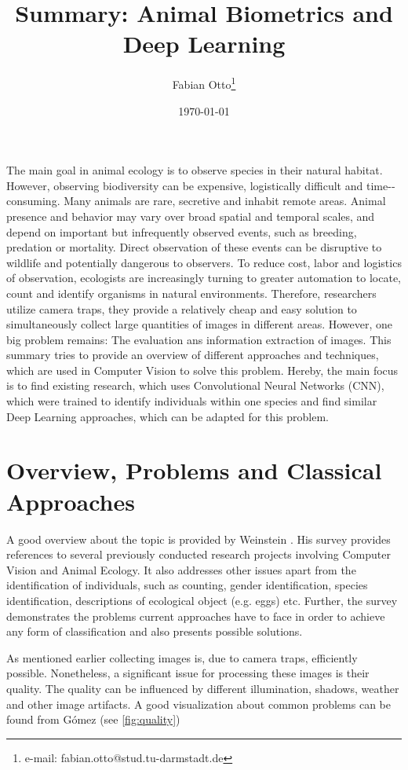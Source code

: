 \documentclass[electronic]{vgtc}             %
\title{Summary: Animal Biometrics and Deep Learning} %
\author{Fabian Otto\thanks{e-mail: fabian.otto@stud.tu-darmstadt.de}}
\affiliation{\scriptsize Technische Universit\"at Darmstadt}
\date{\today}
\begin{document}
	\maketitle
	
	The main goal in animal ecology is to observe species in their natural habitat.
	However, observing biodiversity can be expensive, logistically difficult and time-­consuming.
	Many animals are rare, secretive and inhabit remote areas. 
	Animal presence and behavior may vary over broad spatial and temporal scales, and depend on important but infrequently observed events, such as breeding, predation or mortality.
	Direct observation of these events can be disruptive to wildlife and potentially dangerous to observers.
	To reduce cost, labor and logistics of observation, ecologists are increasingly turning to greater automation to locate, count and identify organisms in natural environments.
	Therefore, researchers utilize camera traps, they provide a relatively cheap and easy solution to simultaneously collect large quantities of images in different areas. 
	However, one big problem remains: The evaluation ans information extraction of images.
	This summary tries to provide an overview of different approaches and techniques, which are used in Computer Vision to solve this problem. 
	Hereby, the main focus is to find existing research, which uses Convolutional Neural Networks (CNN), which were trained to identify individuals within one species and find similar Deep Learning approaches, which can be adapted for this problem. 

	\section{Overview, Problems and Classical Approaches\label{sec:problems}}
	A good overview about the topic is provided by Weinstein \cite{Weinstein:2017}.
	His survey provides references to several previously conducted research projects involving Computer Vision and Animal Ecology.
	It also addresses other issues apart from the identification of individuals, such as counting, gender identification, species identification, descriptions of ecological object (e.g. eggs) etc. 
	Further, the survey demonstrates the problems current approaches have to face in order to achieve any form of classification and also presents possible solutions.
	
	As mentioned earlier collecting images is, due to camera traps, efficiently possible.
	Nonetheless, a significant issue for processing these images is their quality.
	The quality can be influenced by different illumination, shadows, weather and other image artifacts.
	A good visualization about common problems can be found from G\'omez \cite{Gomez:2016:Low} (see \autoref{fig:quality})
	
\end{document}
